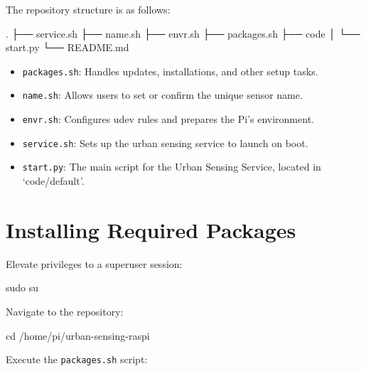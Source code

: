 \documentclass[
  letterpaper,
]{scrbook}
\newenvironment{Shaded}{\begin{snugshade}}{\end{snugshade}}
\newcommand{\BuiltInTok}[1]{\textcolor[rgb]{0.00,0.23,0.31}{#1}}
\newcommand{\ExtensionTok}[1]{\textcolor[rgb]{0.00,0.23,0.31}{#1}}
\newcommand{\FunctionTok}[1]{\textcolor[rgb]{0.28,0.35,0.67}{#1}}
\newcommand{\NormalTok}[1]{\textcolor[rgb]{0.00,0.23,0.31}{#1}}
\providecommand{\tightlist}{%
  \setlength{\itemsep}{0pt}\setlength{\parskip}{0pt}}\usepackage{longtable,booktabs,array}
\begin{document}
The repository structure is as follows:

\begin{Shaded}
\begin{Highlighting}[]
\BuiltInTok{.}
\ExtensionTok{├──}\NormalTok{ service.sh}
\ExtensionTok{├──}\NormalTok{ name.sh}
\ExtensionTok{├──}\NormalTok{ envr.sh}
\ExtensionTok{├──}\NormalTok{ packages.sh}
\ExtensionTok{├──}\NormalTok{ code}
\ExtensionTok{│}\NormalTok{   └── start.py}
\ExtensionTok{└──}\NormalTok{ README.md}
\end{Highlighting}
\end{Shaded}

\begin{itemize}
\tightlist
\item
  \texttt{packages.sh}: Handles updates, installations, and other setup
  tasks.
\item
  \texttt{name.sh}: Allows users to set or confirm the unique sensor
  name.
\item
  \texttt{envr.sh}: Configures udev rules and prepares the Pi's
  environment.
\item
  \texttt{service.sh}: Sets up the urban sensing service to launch on
  boot.
\item
  \texttt{start.py}: The main script for the Urban Sensing Service,
  located in `code/default'.
\end{itemize}

\hypertarget{installing-required-packages}{%
\section{Installing Required
Packages}\label{installing-required-packages}}

Elevate privileges to a superuser session:

\begin{Shaded}
\begin{Highlighting}[]
\FunctionTok{sudo}\NormalTok{ su}
\end{Highlighting}
\end{Shaded}

Navigate to the repository:

\begin{Shaded}
\begin{Highlighting}[]
\BuiltInTok{cd}\NormalTok{ /home/pi/urban{-}sensing{-}raspi}
\end{Highlighting}
\end{Shaded}

Execute the \texttt{packages.sh} script:
\end{document}

